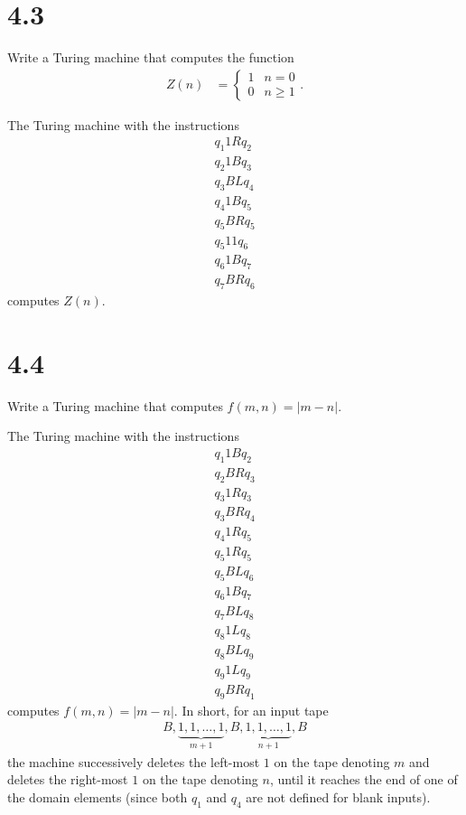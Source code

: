 \documentclass[10pt]{mypackage}
\begin{document}
\section{4.3}%
\begin{problem}
  Write a Turing machine that computes the function
  \begin{align*}
    Z(n) &= \begin{cases}
      1 & n = 0\\
      0 & n \geq 1
    \end{cases}.
  \end{align*}
\end{problem}
\begin{solution}
  The Turing machine with the instructions
  \begin{align*}
    q_1 1 R q_2\\
    q_2 1 B q_3\\
    q_3 B L q_4\\
    q_4 1 B q_5\\
    q_5 B R q_5\\
    q_5 1 1 q_6\\
    q_6 1 B q_7\\
    q_7 B R q_6
  \end{align*}
  computes $Z(n)$.
\end{solution}
\section{4.4}%
\begin{problem}
  Write a Turing machine that computes $f\left(m,n\right) = \left\vert m-n \right\vert$.
\end{problem}
\begin{solution}
  The Turing machine with the instructions
  \begin{align*}
    q_1 1 B q_2\\
    q_2 B R q_3\\
    q_3 1 R q_3\\
    q_3 B R q_4\\
    q_4 1 R q_5\\
    q_5 1 R q_5\\
    q_5 B L q_6\\
    q_6 1 B q_7\\
    q_7 B L q_8\\
    q_8 1 L q_8\\
    q_8 B L q_9\\
    q_9 1 L q_9\\
    q_9 B R q_1
  \end{align*}
  computes $f\left(m,n\right) = \left\vert m-n \right\vert$. In short, for an input tape
  \begin{align*}
    B,\underbrace{1,1,\dots,1}_{m+1},B,\underbrace{1,1,\dots,1}_{n+1},B
  \end{align*}
  the machine successively deletes the left-most $1$ on the tape denoting $m$ and deletes the right-most $1$ on the tape denoting $n$, until it reaches the end of one of the domain elements (since both $q_1$ and $q_4$ are not defined for blank inputs).
\end{solution}
\end{document}
